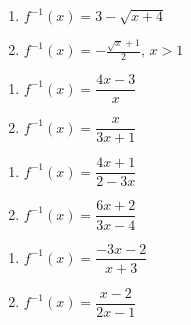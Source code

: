 \begin{multicols}{2}
\begin{enumerate}
\setcounter{enumi}{\value{HW}}

\item $f^{-1}(x) = 3 - \sqrt{x+4}$
\item $f^{-1}(x) =-\frac{\sqrt{x}+1}{2}$, $x > 1$

\setcounter{HW}{\value{enumi}}
\end{enumerate}
\end{multicols}

\begin{multicols}{2}
\begin{enumerate}
\setcounter{enumi}{\value{HW}}

\item $f^{-1}(x) = \dfrac{4x-3}{x}$
\item $f^{-1}(x) = \dfrac{x}{3x+1}$

\setcounter{HW}{\value{enumi}}
\end{enumerate}
\end{multicols}

\begin{multicols}{2}
\begin{enumerate}
\setcounter{enumi}{\value{HW}}

\item $f^{-1}(x) = \dfrac{4x+1}{2-3x}$
\item $f^{-1}(x) = \dfrac{6x + 2}{3x - 4}$

\setcounter{HW}{\value{enumi}}
\end{enumerate}
\end{multicols}

\begin{multicols}{2}
\begin{enumerate}
\setcounter{enumi}{\value{HW}}

\item $f^{-1}(x) = \dfrac{-3x - 2}{x + 3}$
\item $f^{-1}(x) = \dfrac{x-2}{2x-1}$ 

\setcounter{HW}{\value{enumi}}
\end{enumerate}
\end{multicols}


